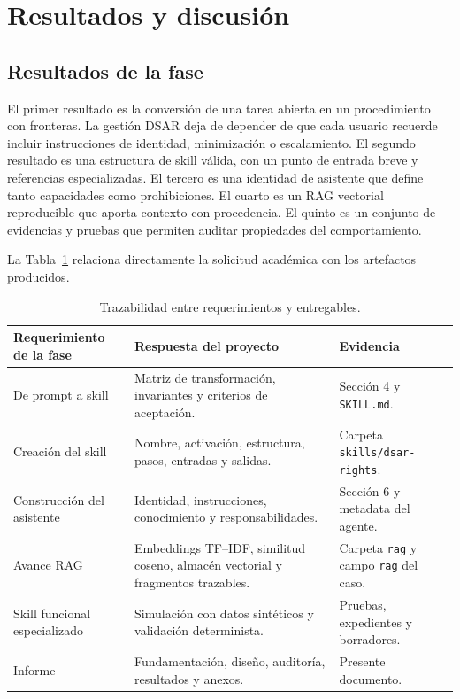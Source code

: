 \documentclass[11pt,a4paper]{article}
\begin{document}
\section{Resultados y discusión}

\subsection{Resultados de la fase}

El primer resultado es la conversión de una tarea abierta en un procedimiento con fronteras. La gestión DSAR deja de depender de que cada usuario recuerde incluir instrucciones de identidad, minimización o escalamiento. El segundo resultado es una estructura de skill válida, con un punto de entrada breve y referencias especializadas. El tercero es una identidad de asistente que define tanto capacidades como prohibiciones. El cuarto es un RAG vectorial reproducible que aporta contexto con procedencia. El quinto es un conjunto de evidencias y pruebas que permiten auditar propiedades del comportamiento.

La Tabla~\ref{tab:deliverables} relaciona directamente la solicitud académica con los artefactos producidos.

\begin{table}[H]
\centering
\caption{Trazabilidad entre requerimientos y entregables.}
\label{tab:deliverables}
\begin{tabularx}{\textwidth}{p{4.2cm}X p{3.6cm}}
\toprule
Requerimiento de la fase & Respuesta del proyecto & Evidencia \\
\midrule
De prompt a skill & Matriz de transformación, invariantes y criterios de aceptación. & Sección 4 y \texttt{SKILL.md}. \\
Creación del skill & Nombre, activación, estructura, pasos, entradas y salidas. & Carpeta \texttt{skills/dsar-rights}. \\
Construcción del asistente & Identidad, instrucciones, conocimiento y responsabilidades. & Sección 6 y metadata del agente. \\
Avance RAG & Embeddings TF--IDF, similitud coseno, almacén vectorial y fragmentos trazables. & Carpeta \texttt{rag} y campo \texttt{rag} del caso. \\
Skill funcional especializado & Simulación con datos sintéticos y validación determinista. & Pruebas, expedientes y borradores. \\
Informe & Fundamentación, diseño, auditoría, resultados y anexos. & Presente documento. \\
\bottomrule
\end{tabularx}
\end{table}
\end{document}

